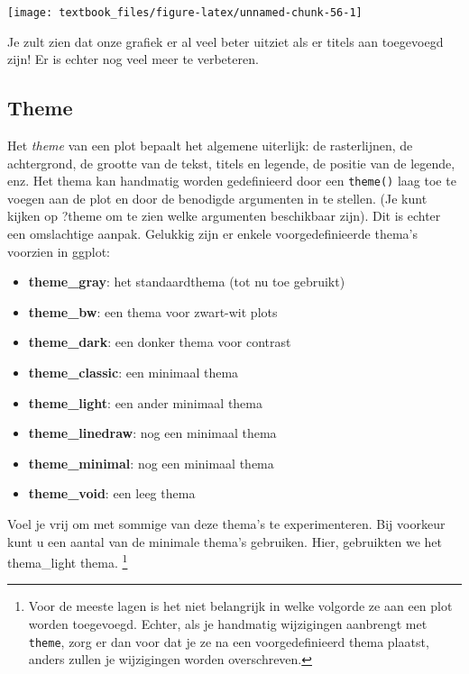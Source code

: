 \documentclass[]{tufte-book}
\providecommand{\tightlist}{%
  \setlength{\itemsep}{0pt}\setlength{\parskip}{0pt}}
\begin{document}
\texttt{[image: textbook\_files/figure-latex/unnamed-chunk-56-1]}

Je zult zien dat onze grafiek er al veel beter uitziet als er titels aan toegevoegd zijn! Er is echter nog veel meer te verbeteren.

\hypertarget{theme}{%
\subsection{Theme}\label{theme}}

Het \emph{theme} van een plot bepaalt het algemene uiterlijk: de rasterlijnen, de achtergrond, de grootte van de tekst, titels en legende, de positie van de legende, enz. Het thema kan handmatig worden gedefinieerd door een \texttt{theme()} laag toe te voegen aan de plot en door de benodigde argumenten in te stellen. (Je kunt kijken op ?theme om te zien welke argumenten beschikbaar zijn). Dit is echter een omslachtige aanpak. Gelukkig zijn er enkele voorgedefinieerde thema's voorzien in ggplot:

\begin{itemize}
\tightlist
\item
  \textbf{theme\_gray}: het standaardthema (tot nu toe gebruikt)
\item
  \textbf{theme\_bw}: een thema voor zwart-wit plots
\item
  \textbf{theme\_dark}: een donker thema voor contrast
\item
  \textbf{theme\_classic}: een minimaal thema
\item
  \textbf{theme\_light}: een ander minimaal thema
\item
  \textbf{theme\_linedraw}: nog een minimaal thema
\item
  \textbf{theme\_minimal}: nog een minimaal thema
\item
  \textbf{theme\_void}: een leeg thema
\end{itemize}

Voel je vrij om met sommige van deze thema's te experimenteren. Bij voorkeur kunt u een aantal van de minimale thema's gebruiken. Hier, gebruikten we het thema\_light thema. \footnote{Voor de meeste lagen is het niet belangrijk in welke volgorde ze aan een plot worden toegevoegd. Echter, als je handmatig wijzigingen aanbrengt met \texttt{theme}, zorg er dan voor dat je ze na een voorgedefinieerd thema plaatst, anders zullen je wijzigingen worden overschreven.}
\end{document}
